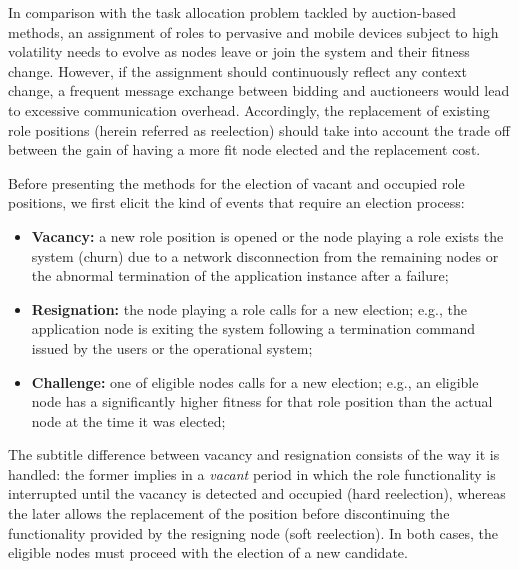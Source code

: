 In comparison with the task allocation problem tackled by auction-based methods, an assignment of roles to pervasive and mobile devices subject to high volatility needs to evolve as nodes leave or join the system and their fitness change. However, if the assignment should continuously reflect any context change, a frequent message exchange between bidding and auctioneers would lead to excessive communication overhead. Accordingly, the replacement of existing role positions (herein referred as reelection) should take into account the trade off between the gain of having a more fit node elected and the replacement cost. 


Before presenting the methods for the election of vacant and occupied role positions, we first elicit the kind of events that require an election process:

\begin{itemize}
	
	\item \textbf{Vacancy:} a new role position is opened or the node playing a role exists the system (churn) due to a network disconnection from the remaining nodes or the abnormal termination of the application instance after a failure;
	
	\item \textbf{Resignation:} the node playing a role calls for a new election; e.g., the application node is exiting the system following a termination command issued by the users or the operational system;
	
	\item \textbf{Challenge:} one of eligible nodes calls for a new election; e.g., an eligible node has a significantly higher fitness for that role position than the actual node at the time it was elected;
	
	
\end{itemize}
\medskip
 
The subtitle difference between vacancy and resignation consists of the way it is handled: the former implies in a \textit{vacant} period in which the role functionality is interrupted until the vacancy is detected and occupied (hard reelection), whereas the later allows the replacement of the position before discontinuing the functionality provided by the resigning node (soft reelection). In both cases, the eligible nodes must proceed with the election of a new candidate.

